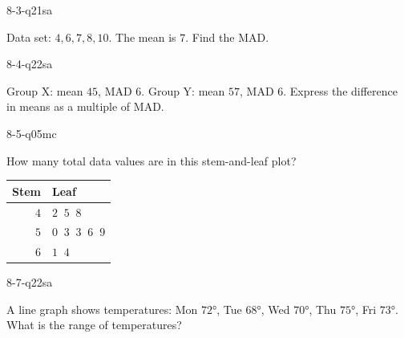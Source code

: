 \begin{practiceQuestion}{8-3-q21}{sa}
\begin{questionText}
Data set: $4, 6, 7, 8, 10$. The mean is $7$. Find the MAD.
\end{questionText}
\end{practiceQuestion}

\begin{practiceQuestion}{8-4-q22}{sa}
\begin{questionText}
Group X: mean $45$, MAD $6$. Group Y: mean $57$, MAD $6$. Express the difference in means as a multiple of MAD.
\end{questionText}
\end{practiceQuestion}

\begin{practiceQuestion}{8-5-q05}{mc}
\begin{questionText}
How many total data values are in this stem-and-leaf plot?

\begin{center}
\begin{tabular}{r|l}
\textbf{Stem} & \textbf{Leaf} \\
\hline
$4$ & $2\;\;5\;\;8$ \\
$5$ & $0\;\;3\;\;3\;\;6\;\;9$ \\
$6$ & $1\;\;4$
\end{tabular}
\end{center}
\end{questionText}
\end{practiceQuestion}

\begin{practiceQuestion}{8-7-q22}{sa}
\begin{questionText}
A line graph shows temperatures: Mon $72°$, Tue $68°$, Wed $70°$, Thu $75°$, Fri $73°$. What is the range of temperatures?
\end{questionText}
\end{practiceQuestion}

